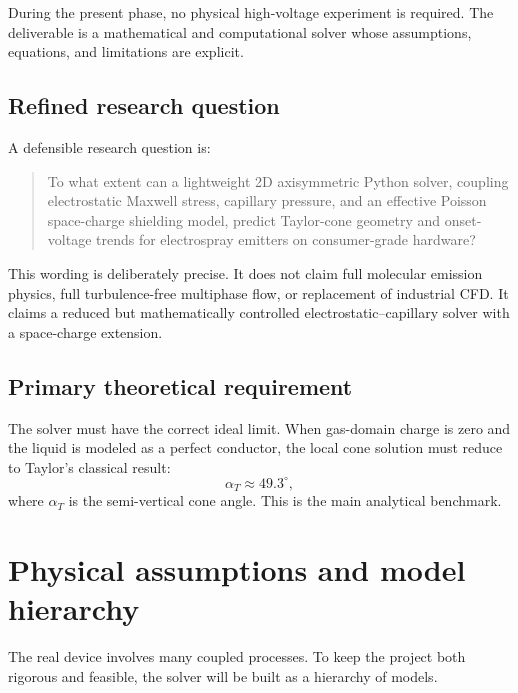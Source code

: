 \documentclass[11pt]{article}
\begin{document}
During the present phase, no physical high-voltage experiment is required. The deliverable is a mathematical and computational solver whose assumptions, equations, and limitations are explicit.

\subsection{Refined research question}

A defensible research question is:
\begin{quote}
To what extent can a lightweight 2D axisymmetric Python solver, coupling electrostatic Maxwell stress, capillary pressure, and an effective Poisson space-charge shielding model, predict Taylor-cone geometry and onset-voltage trends for electrospray emitters on consumer-grade hardware?
\end{quote}

This wording is deliberately precise. It does not claim full molecular emission physics, full turbulence-free multiphase flow, or replacement of industrial CFD. It claims a reduced but mathematically controlled electrostatic--capillary solver with a space-charge extension.

\subsection{Primary theoretical requirement}

The solver must have the correct ideal limit. When gas-domain charge is zero and the liquid is modeled as a perfect conductor, the local cone solution must reduce to Taylor's classical result:
\begin{equation}
    \alpha_T \approx 49.3^\circ,
\end{equation}
where \(\alpha_T\) is the semi-vertical cone angle. This is the main analytical benchmark.

\section{Physical assumptions and model hierarchy}

The real device involves many coupled processes. To keep the project both rigorous and feasible, the solver will be built as a hierarchy of models.
\end{document}
